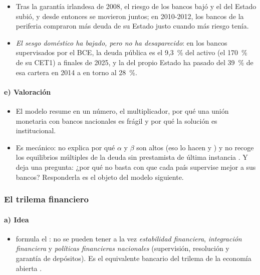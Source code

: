 \documentclass[11pt]{article}
\begin{document}
\begin{itemize}
\item Tras la garantía irlandesa de 2008, el riesgo de los bancos bajó y el del Estado subió, y desde entonces se movieron juntos\nocite{AcharyaDrechslerSchnabl2014}; en 2010-2012, los bancos de la periferia compraron más deuda de su Estado justo cuando más riesgo tenía\nocite{AcharyaSteffen2015}.
\item \emph{El sesgo doméstico ha bajado, pero no ha desaparecido}: en los bancos supervisados por el BCE, la deuda pública es el 9,3~\% del activo (el 170~\% de su CET1) a finales de 2025, y la del propio Estado ha pasado del 39~\% de esa cartera en 2014 a en torno al 28~\%\nocite{Buch2026Soberana}.
\end{itemize}

\paragraph{e) Valoración}

\begin{itemize}
\item El modelo resume en un número, el multiplicador, por qué una unión monetaria con bancos nacionales es frágil y por qué la solución es institucional.
\item Es mecánico: no explica por qué $\alpha$ y $\beta$ son altos (eso lo hacen  y ) y no recoge los equilibrios múltiples de la deuda sin prestamista de última instancia . Y deja una pregunta: ¿por qué no basta con que cada país supervise mejor a sus bancos? Responderla es el objeto del modelo siguiente.
\end{itemize}

\subsubsection{El trilema financiero}\label{sec:trilema}

\paragraph{a) Idea}

\begin{itemize}
\item \textcite{Schoenmaker2011Trilemma} formula el : no se pueden tener a la vez \emph{estabilidad financiera}, \emph{integración financiera} y \emph{políticas financieras nacionales} (supervisión, resolución y garantía de depósitos). Es el equivalente bancario del trilema de la economía abierta  .
\end{itemize}
\end{document}
